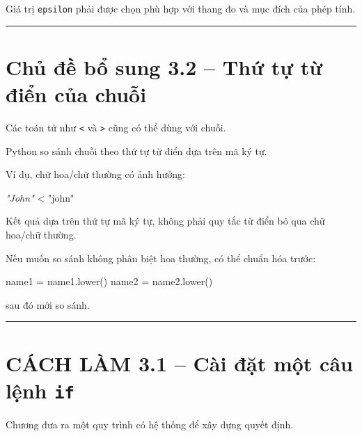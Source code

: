 \documentclass[
  11pt,
  a4paper,
]{article}
\newenvironment{Shaded}{}{}
\newcommand{\CommentTok}[1]{\textcolor[rgb]{0.38,0.63,0.69}{\textit{#1}}}
\newcommand{\NormalTok}[1]{#1}
\newcommand{\OperatorTok}[1]{\textcolor[rgb]{0.40,0.40,0.40}{#1}}
\newcommand{\StringTok}[1]{\textcolor[rgb]{0.25,0.44,0.63}{#1}}
\begin{document}
Giá trị \texttt{epsilon} phải được chọn phù hợp với thang đo và mục đích
của phép tính.

\begin{center}\rule{0.5\linewidth}{0.5pt}\end{center}

\section{Chủ đề bổ sung 3.2 -- Thứ tự từ điển của
chuỗi}\label{chux1ee7-ux111ux1ec1-bux1ed5-sung-3.2-thux1ee9-tux1ef1-tux1eeb-ux111iux1ec3n-cux1ee7a-chuux1ed7i}

Các toán tử như \texttt{\textless{}} và \texttt{\textgreater{}} cũng có
thể dùng với chuỗi.

Python so sánh chuỗi theo thứ tự từ điển dựa trên mã ký tự.

Ví dụ, chữ hoa/chữ thường có ảnh hưởng:

\begin{Shaded}
\begin{Highlighting}[]
\CommentTok{"John"} \OperatorTok{\textless{}} \StringTok{"john"}
\end{Highlighting}
\end{Shaded}

Kết quả dựa trên thứ tự mã ký tự, không phải quy tắc từ điển bỏ qua chữ
hoa/chữ thường.

Nếu muốn so sánh không phân biệt hoa thường, có thể chuẩn hóa trước:

\begin{Shaded}
\begin{Highlighting}[]
\NormalTok{name1 }\OperatorTok{=}\NormalTok{ name1.lower()}
\NormalTok{name2 }\OperatorTok{=}\NormalTok{ name2.lower()}
\end{Highlighting}
\end{Shaded}

sau đó mới so sánh.

\begin{center}\rule{0.5\linewidth}{0.5pt}\end{center}

\section{\texorpdfstring{CÁCH LÀM 3.1 -- Cài đặt một câu lệnh
\texttt{if}}{CÁCH LÀM 3.1 -- Cài đặt một câu lệnh if}}\label{cuxe1ch-luxe0m-3.1-cuxe0i-ux111ux1eb7t-mux1ed9t-cuxe2u-lux1ec7nh-if}

Chương đưa ra một quy trình có hệ thống để xây dựng quyết định.
\end{document}
